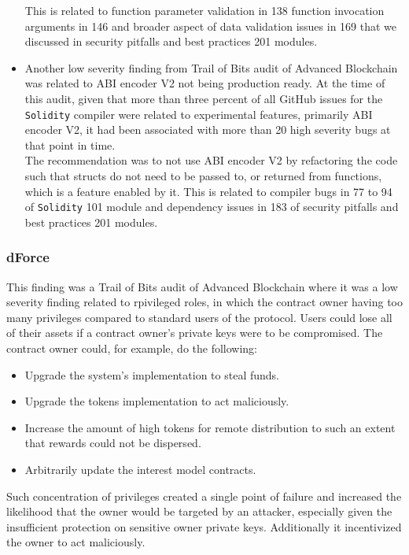 \begin{itemize}
  This is related to function parameter validation in 138 function
  invocation arguments in 146 and broader aspect of data validation
  issues in 169 that we discussed in security pitfalls and best
  practices 201 modules.
\item
  Another low severity finding from Trail of Bits audit of Advanced
  Blockchain was related to ABI encoder V2 not being production ready.
  At the time of this audit, given that more than three percent of all
  GitHub issues for the \texttt{Solidity} compiler were related to
  experimental features, primarily ABI encoder V2, it had been
  associated with more than 20 high severity bugs at that point in
  time.\\

  The recommendation was to not use ABI encoder V2 by refactoring the
  code such that structs do not need to be passed to, or returned from
  functions, which is a feature enabled by it. This is related to
  compiler bugs in 77 to 94 of \texttt{Solidity} 101 module and
  dependency issues in 183 of security pitfalls and best practices 201
  modules.
\end{itemize}

\subsubsection{dForce}\label{dforce}

This finding was a Trail of Bits audit of Advanced Blockchain where it
was a low severity finding related to rpivileged roles, in which the
contract owner having too many privileges compared to standard users of
the protocol. Users could lose all of their assets if a contract owner's
private keys were to be compromised. The contract owner could, for
example, do the following:

\begin{itemize}
\tightlist
\item
  Upgrade the system's implementation to steal funds.
\item
  Upgrade the tokens implementation to act maliciously.
\item
  Increase the amount of high tokens for remote distribution to such an
  extent that rewards could not be dispersed.
\item
  Arbitrarily update the interest model contracts.
\end{itemize}

Such concentration of privileges created a single point of failure and
increased the likelihood that the owner would be targeted by an
attacker, especially given the insufficient protection on sensitive
owner private keys. Additionally it incentivized the owner to act
maliciously.

